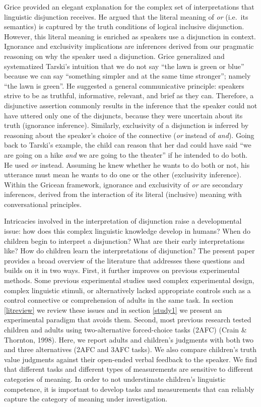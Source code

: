 \documentclass[floatsintext,man]{apa6}
\theoremstyle{definition}
\theoremstyle{definition}
\theoremstyle{definition}
\theoremstyle{remark}
\begin{document}
Grice provided an elegant explanation for the complex set of
interpretations that linguistic disjunction receives. He argued that the
literal meaning of \emph{or} (i.e.~its semantics) is captured by the
truth conditions of logical inclusive disjunction. However, this literal
meaning is enriched as speakers use a disjunction in context. Ignorance
and exclusivity implications are inferences derived from our pragmatic
reasoning on why the speaker used a disjunction. Grice generalized and
systematized Tarski's intuition that we do not say \enquote{the lawn is
green or blue} because we can say \enquote{something simpler and at the
same time stronger}; namely \enquote{the lawn is green}. He suggested a
general communicative principle: speakers strive to be as truthful,
informative, relevant, and brief as they can. Therefore, a disjunctive
assertion commonly results in the inference that the speaker could not
have uttered only one of the disjuncts, because they were uncertain
about its truth (ignorance inference). Similarly, exclusivity of a
disjunction is inferred by reasoning about the speaker's choice of the
connective (\emph{or} instead of \emph{and}). Going back to Tarski's
example, the child can reason that her dad could have said \enquote{we
are going on a hike \emph{and} we are going to the theater} if he
intended to do both. He used \emph{or} instead. Assuming he knew whether
he wants to do both or not, his utterance must mean he wants to do one
or the other (exclusivity inference). Within the Gricean framework,
ignorance and exclusivity of \emph{or} are secondary inferences, derived
from the interaction of its literal (inclusive) meaning with
conversational principles.

Intricacies involved in the interpretation of disjunction raise a
developmental issue: how does this complex linguistic knowledge develop
in humans? When do children begin to interpret a disjunction? What are
their early interpretations like? How do children learn the
interpretations of disjunction? The present paper provides a broad
overview of the literature that addresses these questions and builds on
it in two ways. First, it further improves on previous experimental
methods. Some previous experimental studies used complex experimental
design, complex linguistic stimuli, or alternatively lacked appropriate
controls such as a control connective or comprehension of adults in the
same task. In section \ref{litreview} we review these issues and in
section \ref{study1} we present an experimental paradigm that avoids
them. Second, most previous research tested children and adults using
two-alternative forced-choice tasks (2AFC) (Crain \& Thornton, 1998).
Here, we report adults and children's judgments with both two and three
alternatives (2AFC and 3AFC tasks). We also compare children's truth
value judgments against their open-ended verbal feedback to the speaker.
We find that different tasks and different types of measurements are
sensitive to different categories of meaning. In order to not
understimate children's linguistic competence, it is important to
develop tasks and measurements that can reliably capture the category of
meaning under investigation.
\end{document}
